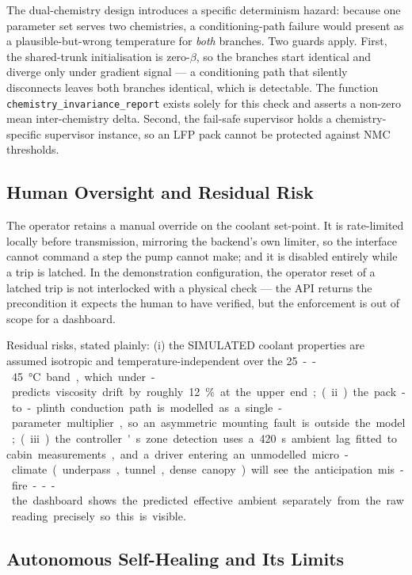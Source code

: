 \documentclass[journal,10pt,compsoc,onecolumn]{IEEEtran}
\begin{document}
\noindent
The dual-chemistry design introduces a specific determinism hazard: because one
parameter set serves two chemistries, a conditioning-path failure would present
as a plausible-but-wrong temperature for \emph{both} branches. Two guards apply.
First, the shared-trunk initialisation is zero-\(\beta\), so the branches start
identical and diverge only under gradient signal --- a conditioning path that
silently disconnects leaves both branches identical, which is detectable. The
function \texttt{chemistry\_invariance\_report} exists solely for this check and
asserts a non-zero mean inter-chemistry delta. Second, the fail-safe supervisor
holds a chemistry-specific supervisor instance, so an LFP pack cannot be
protected against NMC thresholds.

\subsection{Human Oversight and Residual Risk}

\noindent
The operator retains a manual override on the coolant set-point. It is
rate-limited locally before transmission, mirroring the backend's own limiter, so
the interface cannot command a step the pump cannot make; and it is disabled
entirely while a trip is latched. In the demonstration configuration, the
operator reset of a latched trip is not interlocked with a physical check --- the
API returns the precondition it expects the human to have verified, but the
enforcement is out of scope for a dashboard.

\noindent
Residual risks, stated plainly: (i) the SIMULATED coolant properties are
assumed isotropic and temperature-independent over the \SI{25}--\SI{45}{\degreeCelsius}
band, which under-predicts viscosity drift by roughly \SI{12}{\percent} at the
upper end; (ii) the pack-to-plinth conduction path is modelled as a
single-parameter multiplier, so an asymmetric mounting fault is outside the
model; (iii) the controller's zone detection uses a \SI{420}{\second} ambient
lag fitted to cabin measurements, and a driver entering an unmodelled
micro-climate (underpass, tunnel, dense canopy) will see the anticipation
mis-fire --- the dashboard shows the predicted effective ambient separately from
the raw reading precisely so this is visible.

\subsection{Autonomous Self-Healing and Its Limits}
\label{sec:autonomy}
\end{document}
